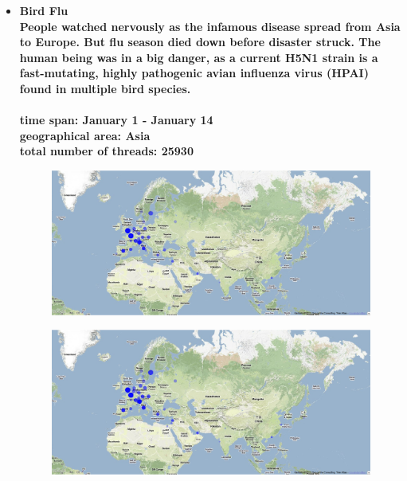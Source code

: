 \documentclass[11pt,a4paper,english]{article}
\begin{document}
				\begin{itemize}
					\item \bf Bird Flu \rm
						\\ People watched nervously as the infamous disease spread from Asia to Europe. But flu season died down before disaster struck. The human being was in a big danger, as a current H5N1 strain is a fast-mutating, highly pathogenic avian influenza virus (HPAI) found in multiple bird species.
						\\\\ \bf time span: \rm January 1 - January 14
						\\ \bf geographical area: \rm Asia
						\\ \bf total number of threads: \rm 25930
						\begin{figure}[H]
							\vspace{-5pt}
  							\begin{center}
								\includegraphics[width=130mm]{img/pre-birdflu}
							\end{center}
							\vspace{-13pt}
						\end{figure}
						\begin{figure}[H]
							\vspace{-13pt}
	  						\begin{center}
								\includegraphics[width=130mm]{img/post-birdflu}
							\end{center}
							\vspace{-5pt}
						\end{figure}
						

\end{itemize}
\end{document}
